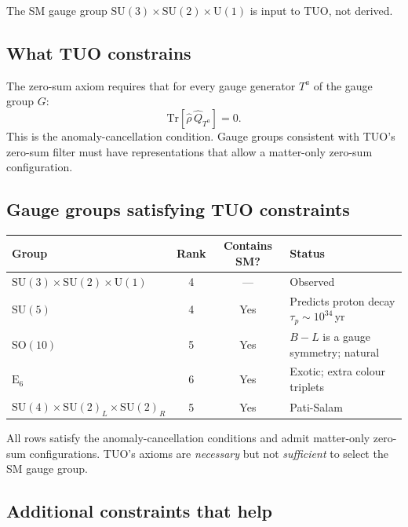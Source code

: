 \documentclass[12pt,a4paper]{article}
\theoremstyle{remark}
\newcommand{\rhohat}{\hat{\rho}}
\begin{document}
\begin{tcolorbox}[opbox,title={Open Problem 6}]
The SM gauge group $\mathrm{SU}(3)\times\mathrm{SU}(2)\times\mathrm{U}(1)$
is input to TUO, not derived.
\end{tcolorbox}

\subsection{What TUO constrains}

The zero-sum axiom requires that for every gauge generator $T^a$
of the gauge group $G$:
\[
  \mathrm{Tr}[\rhohat\,\hat{Q}_{T^a}] = 0.
\]
This is the anomaly-cancellation condition.
Gauge groups consistent with TUO's zero-sum filter must have
representations that allow a matter-only zero-sum configuration.

\subsection{Gauge groups satisfying TUO constraints}

\begin{center}
\begin{tabular}{lccp{5.5cm}}
\toprule
Group & Rank & Contains SM? & Status \\
\midrule
$\mathrm{SU}(3)\times\mathrm{SU}(2)\times\mathrm{U}(1)$ & 4 & --- & Observed \\
$\mathrm{SU}(5)$ & 4 & Yes & Predicts proton decay $\tau_p\sim10^{34}$\,yr \\
$\mathrm{SO}(10)$ & 5 & Yes & $B-L$ is a gauge symmetry; natural \\
$\mathrm{E}_6$ & 6 & Yes & Exotic; extra colour triplets \\
$\mathrm{SU}(4)\times\mathrm{SU}(2)_L\times\mathrm{SU}(2)_R$ & 5 & Yes & Pati-Salam \\
\bottomrule
\end{tabular}
\end{center}

All rows satisfy the anomaly-cancellation conditions and admit
matter-only zero-sum configurations.
TUO's axioms are \emph{necessary} but not \emph{sufficient} to
select the SM gauge group.

\subsection{Additional constraints that help}
\end{document}
